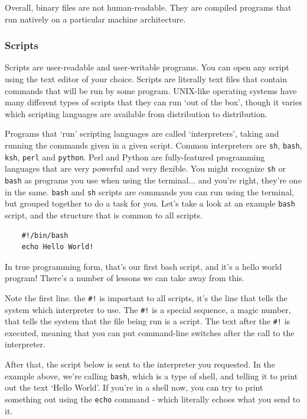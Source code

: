 	Overall, binary files are not human-readable. They are compiled programs that run natively on a particular machine
	architecture.

\subsubsection {Scripts}
	Scripts are user-readable and user-writable programs.  You can open any script using
	the text editor of your choice. Scripts are literally text files that contain commands
	that will be run by some program. UNIX-like operating systems have many different
	types of scripts that they can run `out of the box', though it varies which scripting 
	languages are available from distribution to distribution.
	
	Programs that `run' scripting languages are called `interpreters', taking and running 
	the commands given in a given script. Common interpreters are {\tt sh}, {\tt bash}, {\tt ksh},
	{\tt perl} and {\tt python}. Perl and Python are fully-featured programming languages that
	are very powerful and very flexible.  You might recognize {\tt sh} or {\tt bash} as programs you
	use when using the terminal... and you're right, they're one in the same. {\tt bash} and {\tt sh}
	scripts are commands you can run using the terminal, but grouped together to do a task for you.
	Let's take a look at an example {\tt bash} script, and the structure that is common to all scripts.
	
	{\begin{verbatim}
	#!/bin/bash
	echo Hello World!
	\end{verbatim}
	}
	
	In true programming form, that's our first bash script, and it's a hello world program!
	There's a number of lessons we can take away from this.
	
	Note the first line. the {\tt \#!} is important to all scripts, it's the line that tells the 
	system which interpreter to use. The {\tt \#!} is a special sequence, a magic number, that 
	tells the system that the file being run is a script. The text after the {\tt \#!} is executed, meaning 
	that you can put command-line switches after the call to the interpreter.
	
	After that, the script below is sent to the interpreter you requested. In the example above, we're calling
	{\tt bash}, which is a type of shell, and telling it to print out the text `Hello World'. If you're in
	a shell now, you can try to print something out using the {\tt echo} command - which literally echoes what you 
	send to it.
	
